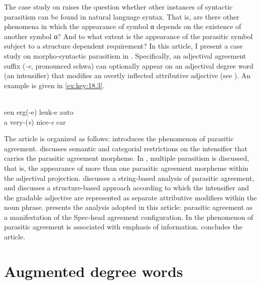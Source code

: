 \documentclass[output=paper]{langsci/langscibook}
\begin{document}
\label{ex:key:18.2}
\z

The case study on  raises the question whether other instances of
syntactic parasitism can be found in natural language syntax. That is, are
there other phenomena in which the appearance of symbol α depends on the
existence of another symbol α? And to what extent is the appearance of the
parasitic symbol subject to a structure dependent requirement? In this article,
I present a case study on morpho-syntactic parasitism in .
Specifically, an adjectival agreement suffix (\emph{-e}, pronounced schwa) can
optionally appear on an adjectival degree word (an intensifier) that modifies
an overtly inflected attributive adjective (see
\citealt{Verdenius1939,Royen1948,Corver1997a}). An example is given in
\eqref{ex:key:18.3}.

\ea%
    \label{ex:key:18.3}\\
    \gll een erg(-e) leuk-e auto\\
         a very-(\emph{e}) nice-\emph{e} car\\
    \glt
\z

The article is organized as follows:  introduces the phenomenon
of parasitic agreement.  discusses semantic and categorial
restrictions on the intensifier that carries the parasitic agreement morpheme.
In , multiple parasitism is discussed, that is, the appearance
of more than one parasitic agreement morpheme within the adjectival projection.
 discusses a string-based analysis of parasitic agreement, and
 discusses a structure-based approach according to which the
intensifier and the gradable adjective are represented as separate attributive
modifiers within the noun phrase.   presents the analysis
adopted in this article: parasitic agreement as a manifestation of the
Spec-head agreement configuration. In  the phenomenon of
parasitic agreement is associated with emphasis of information.
 concludes the article.

\section{Augmented degree words}\label{sec:key:18.2}
\end{document}
